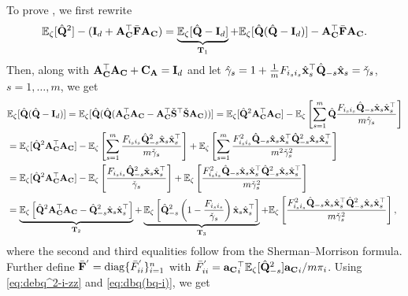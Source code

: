 \documentclass[11pt,a4paper]{article}
\begin{document}
 
To prove , we first rewrite 
\begin{align}\label{eq:debq^2-i-zz}
\EE_{\zeta}[\hat\Q^2] - (\I_d+\A_{\C}^\top\bar \F\A_{\C}) = \underbrace{\EE_{\zeta}[\hat\Q-\I_d]}_{\TT_1} + \EE_{\zeta}[\hat\Q(\hat\Q-\I_d)]-\A_{\C}^\top\bar\F\A_{\C}.
\end{align}
Then,  along with $\A_{\C}^\top\A_{\C}+\C_{\A}=\I_d$ and let $\hat\gamma_s=1+\frac{1}{m}F_{i_si_s}\hat\x_s^\top\hat\Q_{-s}\hat\x_s=\check \gamma_s$, $s=1,\ldots, m$, we get
\begin{align}\label{eq:dbq(bq-i)}
&\EE_{\zeta}[\hat\Q(\hat\Q-\I_d)]
=\EE_{\zeta}[\hat\Q(\hat\Q(\A_{\C}^\top\A_{\C}-\A_{\C}^\top\check\S^\top\check\S\A_{\C}))]=\EE_{\zeta}[\hat\Q^2\A_{\C}^\top\A_{\C}]-\EE_{\zeta}\left[\sum^m_{s=1}\hat\Q\frac{F_{i_si_s}\hat\Q_{-s}\hat\x_s\hat\x_s^\top}{m\hat\gamma_s}\right]\nonumber\\
&=\EE_{\zeta}[\hat\Q^2\A_{\C}^\top\A_{\C}]-\EE_{\zeta}\left[\sum^m_{s=1}\frac{F_{i_si_s}\hat\Q^2_{-s}\hat\x_s\hat\x_s^\top}{m\check \gamma_s}\right]+\EE_{\zeta}\left[\sum^m_{s=1}\frac{F_{i_si_s}^2\hat\Q_{-s}\hat\x_s\hat\x_s^\top\hat\Q^2_{-s}\hat\x_s\hat\x_s^\top}{m^2\check \gamma^2_s}\right]\nonumber\\ 
&=\EE_{\zeta}[\hat\Q^2\A_{\C}^\top\A_{\C}]-\EE_{\zeta}\left[\frac{F_{i_si_s}\hat\Q^2_{-s}\hat\x_s\hat\x_s^\top}{\check \gamma_s}\right]+\EE_{\zeta}\left[\frac{F_{i_si_s}^2\hat\Q_{-s}\hat\x_s\hat\x_s^\top\hat\Q^2_{-s}\hat\x_s\hat\x_s^\top}{m\check \gamma^2_s}\right]\nonumber\\ &=\underbrace{\EE_{\zeta}\left[\hat\Q^2\A_{\C}^\top\A_{\C}-\hat\Q^2_{-s}\hat\x_s\hat\x_s^\top\right]}_{\TT_2}+\underbrace{\EE_{\zeta}\left[\hat\Q^2_{-s} \left(1-\frac{F_{i_si_s}}{\check \gamma_s} \right)\hat\x_s\hat\x_s^\top\right]}_{\TT_3}+\EE_{\zeta}\left[\frac{F_{i_si_s}^2\hat\Q_{-s}\hat\x_s\hat\x_s^\top\hat\Q^2_{-s}\hat\x_s\hat\x_s^\top}{m\check \gamma^2_s}\right],
\end{align}
where the second and third equalities follow from the Sherman--Morrison formula. 
Further define ${\bar \F}^{'}=\diag\{{\bar F}^{'}_{ii}\}^n_{i=1}$ with ${\bar F}^{'}_{ii}={\ba_{\C}}^\top_i\EE_{\zeta}[ \hat\Q_{-s}^{2}]{\ba_{\C}}_i/m\pi_i$. 
Using \eqref{eq:debq^2-i-zz} and \eqref{eq:dbq(bq-i)},  we get
\end{document}
